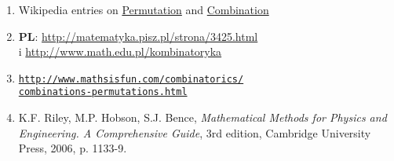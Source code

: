 \documentclass{article}
\begin{document}
\begin{enumerate}
  \item{Wikipedia entries on \href{http://en.wikipedia.org/wiki/Permutation}{Permutation} and \href{http://en.wikipedia.org/wiki/Combination}{Combination}}
  \item{\textbf{PL}: \url{http://matematyka.pisz.pl/strona/3425.html}\\i \url{http://www.math.edu.pl/kombinatoryka}}
  \item{\label{itm:mathsisfun}
    \href{http://www.mathsisfun.com/combinatorics/combinations-permutations.html}{\nolinkurl{http://www.mathsisfun.com/combinatorics/}}\\
    \href{http://www.mathsisfun.com/combinatorics/combinations-permutations.html}{\nolinkurl{combinations-permutations.html}}
  }
  \item{K.F. Riley, M.P. Hobson, S.J. Bence, \textit{Mathematical Methods for Physics and Engineering. A Comprehensive Guide}, 3rd edition, Cambridge University Press, 2006, p. 1133-9.}
\end{enumerate}
\end{document}
